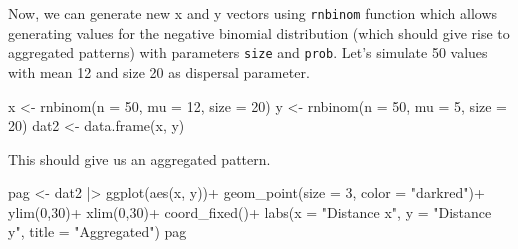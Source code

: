 \documentclass[
  letterpaper,
  DIV=11,
  numbers=noendperiod]{scrreprt}
\newenvironment{Shaded}{\begin{snugshade}}{\end{snugshade}}
\newcommand{\AttributeTok}[1]{\textcolor[rgb]{0.40,0.45,0.13}{#1}}
\newcommand{\DecValTok}[1]{\textcolor[rgb]{0.68,0.00,0.00}{#1}}
\newcommand{\FunctionTok}[1]{\textcolor[rgb]{0.28,0.35,0.67}{#1}}
\newcommand{\NormalTok}[1]{\textcolor[rgb]{0.00,0.23,0.31}{#1}}
\newcommand{\OtherTok}[1]{\textcolor[rgb]{0.00,0.23,0.31}{#1}}
\newcommand{\SpecialCharTok}[1]{\textcolor[rgb]{0.37,0.37,0.37}{#1}}
\newcommand{\StringTok}[1]{\textcolor[rgb]{0.13,0.47,0.30}{#1}}
\begin{document}
Now, we can generate new x and y vectors using \texttt{rnbinom} function
which allows generating values for the negative binomial distribution
(which should give rise to aggregated patterns) with parameters
\texttt{size} and \texttt{prob}. Let's simulate 50 values with mean 12
and size 20 as dispersal parameter.

\begin{Shaded}
\begin{Highlighting}[]
\NormalTok{x }\OtherTok{\textless{}{-}} \FunctionTok{rnbinom}\NormalTok{(}\AttributeTok{n =} \DecValTok{50}\NormalTok{, }\AttributeTok{mu =} \DecValTok{12}\NormalTok{, }\AttributeTok{size =} \DecValTok{20}\NormalTok{)}
\NormalTok{y }\OtherTok{\textless{}{-}} \FunctionTok{rnbinom}\NormalTok{(}\AttributeTok{n =} \DecValTok{50}\NormalTok{, }\AttributeTok{mu =} \DecValTok{5}\NormalTok{, }\AttributeTok{size =} \DecValTok{20}\NormalTok{)}
\NormalTok{dat2 }\OtherTok{\textless{}{-}} \FunctionTok{data.frame}\NormalTok{(x, y)}
\end{Highlighting}
\end{Shaded}

This should give us an aggregated pattern.

\begin{Shaded}
\begin{Highlighting}[]
\NormalTok{pag }\OtherTok{\textless{}{-}}\NormalTok{ dat2 }\SpecialCharTok{|\textgreater{}}
  \FunctionTok{ggplot}\NormalTok{(}\FunctionTok{aes}\NormalTok{(x, y))}\SpecialCharTok{+}
  \FunctionTok{geom\_point}\NormalTok{(}\AttributeTok{size =} \DecValTok{3}\NormalTok{, }\AttributeTok{color =} \StringTok{"darkred"}\NormalTok{)}\SpecialCharTok{+}
  \FunctionTok{ylim}\NormalTok{(}\DecValTok{0}\NormalTok{,}\DecValTok{30}\NormalTok{)}\SpecialCharTok{+}
  \FunctionTok{xlim}\NormalTok{(}\DecValTok{0}\NormalTok{,}\DecValTok{30}\NormalTok{)}\SpecialCharTok{+}
  \FunctionTok{coord\_fixed}\NormalTok{()}\SpecialCharTok{+}
  \FunctionTok{labs}\NormalTok{(}\AttributeTok{x =} \StringTok{"Distance x"}\NormalTok{, }\AttributeTok{y =} \StringTok{"Distance y"}\NormalTok{, }
       \AttributeTok{title =} \StringTok{"Aggregated"}\NormalTok{)}
\NormalTok{pag}
\end{Highlighting}
\end{Shaded}
\end{document}

